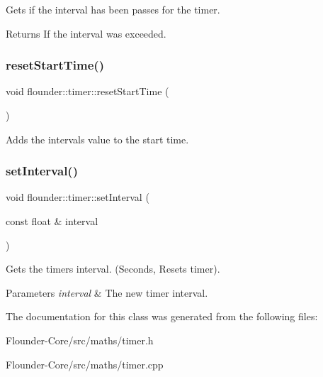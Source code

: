 Gets if the interval has been passes for the timer. 

\begin{DoxyReturn}{Returns}
If the interval was exceeded. 
\end{DoxyReturn}
\mbox{\label{classflounder_1_1timer_af71405c5ec11d085c91aa26d6a8d994c}} 
\subsubsection{\texorpdfstring{reset\+Start\+Time()}{resetStartTime()}}
{\footnotesize\ttfamily void flounder\+::timer\+::reset\+Start\+Time (\begin{DoxyParamCaption}{ }\end{DoxyParamCaption})}



Adds the intervals value to the start time. 

\mbox{\label{classflounder_1_1timer_aabfc8f4c63a88f8dc797cdc7a465b982}} 
\subsubsection{\texorpdfstring{set\+Interval()}{setInterval()}}
{\footnotesize\ttfamily void flounder\+::timer\+::set\+Interval (\begin{DoxyParamCaption}\item[{const float \&}]{interval }\end{DoxyParamCaption})}



Gets the timers interval. (Seconds, Resets timer). 


\begin{DoxyParams}{Parameters}
{\em interval} & The new timer interval. \\
\hline
\end{DoxyParams}


The documentation for this class was generated from the following files\+:\begin{DoxyCompactItemize}
\item 
Flounder-\/\+Core/src/maths/timer.\+h\item 
Flounder-\/\+Core/src/maths/timer.\+cpp\end{DoxyCompactItemize}
